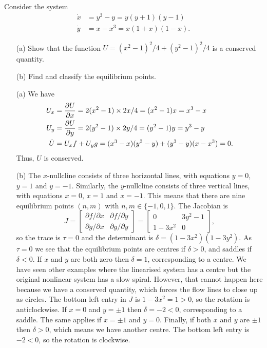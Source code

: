 \documentclass[a4paper]{amsart}
\begin{document}
\begin{exercise}\label{ex-contour-flow}
 Consider the system
 \begin{align*}
  \dot{x} &= y^3-y = y(y+1)(y-1) \\
  \dot{y} &= x-x^3 = x(1+x)(1-x).
 \end{align*}
 \begin{itemize}
  \item[(a)] Show that the function $U=(x^2-1)^2/4+(y^2-1)^2/4$ is a
   conserved quantity.
  \item[(b)] Find and classify the equilibrium points.
 \end{itemize}
\end{exercise}
\begin{solution}\leavevmode
 \begin{itemize}
  \item[(a)] We have
   \begin{align*}
    U_x &= \frac{\partial U}{\partial x} =
             2(x^2-1)\times 2x/4 = (x^2-1)x = x^3-x \\
    U_y &= \frac{\partial U}{\partial y} =
             2(y^2-1)\times 2y/4 = (y^2-1)y = y^3-y \\
    \dot{U} &= U_xf + U_yg = (x^3-x)(y^3-y) + (y^3-y)(x-x^3) = 0.
   \end{align*}
   Thus, $U$ is conserved.
  \item[(b)] 
   The $x$-nullcline consists of three horizontal lines, with equations
   $y=0$, $y=1$ and $y=-1$.  Similarly, the $y$-nullcline consists of
   three vertical lines, with equations $x=0$, $x=1$ and $x=-1$.  This
   means that there are nine equilibrium points $(n,m)$ with
   $n,m\in\{-1,0,1\}$.  The Jacobian is
   \[ J = \left[\begin{array}{cc} \partial f/\partial x & \partial f/\partial y \\
               \partial g/\partial x & \partial g/\partial y \end{array}\right]
        = \left[\begin{array}{cc} 0 & 3y^2-1 \\
               1-3x^2 & 0 \end{array}\right],
   \]
   so the trace is $\tau=0$ and the determinant is
   $\delta=(1-3x^2)(1-3y^2)$.  As $\tau=0$ we see that the equilibrium
   points are centres if $\delta>0$, and saddles if $\delta<0$.  If $x$ and
   $y$ are both zero then $\delta=1$, corresponding to a centre.  We
   have seen other examples where the linearised system has a centre
   but the original nonlinear system has a slow spiral.  However, that
   cannot  happen here because we have a conserved quantity, which
   forces the flow lines to close up as circles.  The bottom
   left entry in $J$ is $1-3x^2=1>0$, so the rotation is anticlockwise.
   If $x=0$ and $y=\pm 1$ then $\delta=-2<0$, corresponding to a saddle.
   The same applies if $x=\pm 1$ and $y=0$.  Finally, if both $x$ and
   $y$ are $\pm 1$ then $\delta>0$, which means we have another centre.  The
   bottom left entry is $-2<0$, so the rotation is clockwise.
 \end{itemize}


\end{solution}
\end{document}
